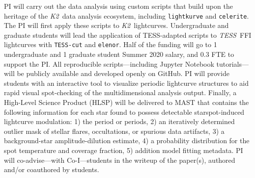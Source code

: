\documentclass[letterpaper,12pt]{article}
\newcommand{\tess}{{\it TESS}}
\newcommand{\ktwo}{{\it K2}}
\begin{document}
PI will carry out the data analysis using custom scripts that build upon the heritage of the \ktwo\ data analysis ecosystem, including \texttt{lightkurve} and \texttt{celerite}.  The PI will first apply these scripts to \ktwo\ lightcurves.  Undergraduate and graduate students will lead the application of TESS-adapted scripts to \tess\ FFI lightcurves with \texttt{TESS-cut} and \texttt{elenor}.  Half of the funding will go to 1 undergraduate and 1 graduate student Summer 2020 salary, and 0.3 FTE to support the PI.  All reproducible scripts---including Jupyter Notebook tutorials---will be publicly available and developed openly on GitHub.
PI will provide students with an interactive tool to visualize periodic lightcurve structures to aid rapid visual spot-checking of the multidimensional analysis output.  Finally, a High-Level Science Product (HLSP) will be delivered to MAST that contains the following information for each star found to possess detectable starspot-induced lightcurve modulation: 1) the period or periods, 2) an iteratively determined outlier mask of stellar flares, occultations, or spurious data artifacts, 3) a background-star amplitude-dilution estimate, 4) a probability distribution for the spot temperature and coverage fraction, 5) addition model fitting metadata.  PI will co-advise---with Co-I---students in the writeup of the paper(s), authored and/or coauthored by students.


\newpage


\end{document}
